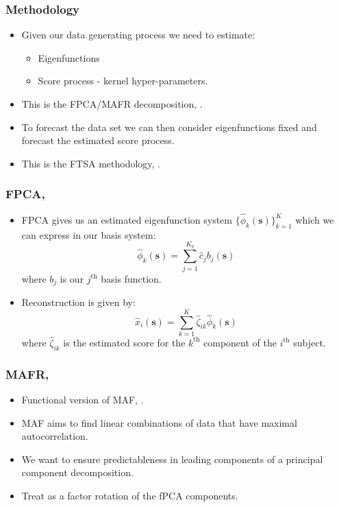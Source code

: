 \documentclass[aspectratio=169]{beamer}
\newcommand{\ve}[1]{\bm{{#1}}}
\begin{document}
  \begin{frame}
    \frametitle{Methodology}
    \begin{itemize}
      \item Given our data generating process we need to estimate:
        \begin{itemize}
          \item Eigenfunctions
          \item Score process - kernel hyper-parameters.
        \end{itemize}
      \item This is the FPCA/MAFR decomposition, \cite{ramsay_functional_2010, hooker_maximal_2016}. 
      \item To forecast the data set we can then consider eigenfunctions fixed and forecast the estimated score process. 
      \item This is the FTSA methodology, \cite{shang_ftsa_2013}.
    \end{itemize}
  \end{frame}

  \begin{frame}
    \frametitle{FPCA, \cite{ramsay_functional_2010}}
      \begin{itemize}
        \item FPCA gives us an estimated eigenfunction system $\{\hat{\phi}_k(\ve{s})\}_{k=1}^K$ which we can express in our basis system:
          \begin{equation}
            \hat{\phi}_k(\ve{s}) = \sum_{j=1}^{K_b}\hat{c}_j b_j(\ve{s})
            \label{eqn:basis_ef}
          \end{equation}
          where $b_j$ is our $j^\text{th}$ basis function.
        \item Reconstruction is given by:
          \begin{equation}
            \hat{x}_i(\ve{s}) = \sum_{k=1}^K \hat{\zeta}_{ik} \hat{\phi}_k(\ve{s})
            \label{eqn:fpca}
          \end{equation}
          where $\hat{\zeta}_{ik}$ is the estimated score for the $k^\text{th}$ component of the $i^\text{th}$ subject.
      \end{itemize}
  \end{frame}

  \begin{frame}
    \frametitle{MAFR, \cite{hooker_maximal_2016}}
      \begin{itemize}
        \item Functional version of MAF, \cite{switzer_minmax_1984}.
        \item MAF aims to find linear combinations of data that have maximal autocorrelation. 
        \item We want to ensure predictableness in leading components of a principal component decomposition.
        \item Treat as a factor rotation of the fPCA components. 
      \end{itemize}
  \end{frame}
  
\end{document}
